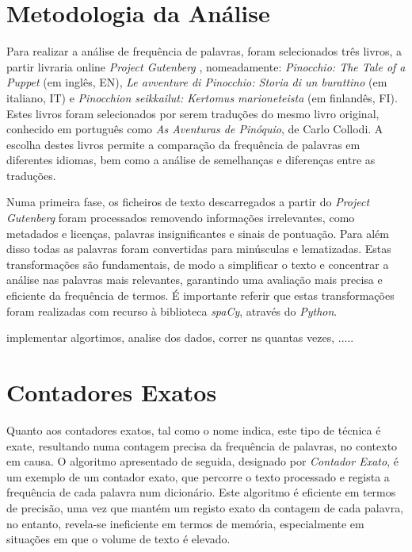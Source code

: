 \documentclass[mirror, portugues]{revdetua}
\begin{document}
\section{Metodologia da Análise}

Para realizar a análise de frequência de palavras, foram selecionados três livros, a partir livraria online \textit{Project Gutenberg} \cite{PG24}, nomeadamente: \textit{Pinocchio: The Tale of a Puppet} (em inglês, EN), \textit{Le avventure di Pinocchio: Storia di un burattino} (em italiano, IT) e \textit{Pinocchion seikkailut: Kertomus marioneteista} (em finlandês, FI). Estes livros foram selecionados por serem traduções do mesmo livro original, conhecido em português como \textit{As Aventuras de Pinóquio}, de Carlo Collodi. A escolha destes livros permite a comparação da frequência de palavras em diferentes idiomas, bem como a análise de semelhanças e diferenças entre as traduções.

Numa primeira fase, os ficheiros de texto descarregados a partir do \textit{Project Gutenberg} foram processados removendo informações irrelevantes, como metadados e licenças, palavras insignificantes e sinais de pontuação. Para além disso todas as palavras foram convertidas para minúsculas e lematizadas. Estas transformações são fundamentais, de modo a simplificar o texto e concentrar a análise nas palavras mais relevantes, garantindo uma avaliação mais precisa e eficiente da frequência de termos. É importante referir que estas transformações foram realizadas com recurso à biblioteca \textit{spaCy}, através do \textit{Python}.


implementar algortimos, analise dos dados, correr ns quantas vezes, .....


\section{Contadores Exatos}

Quanto aos contadores exatos, tal como o nome indica, este tipo de técnica é exate, resultando numa contagem precisa da frequência de palavras, no contexto em causa.
O algoritmo apresentado de seguida, designado por \textit{Contador Exato}, é um exemplo de um contador exato, que percorre o texto processado e regista a frequência de cada palavra num dicionário. Este algoritmo é eficiente em termos de precisão, uma vez que mantém um registo exato da contagem de cada palavra, no entanto, revela-se ineficiente em termos de memória, especialmente em situações em que o volume de texto é elevado.
\end{document}
